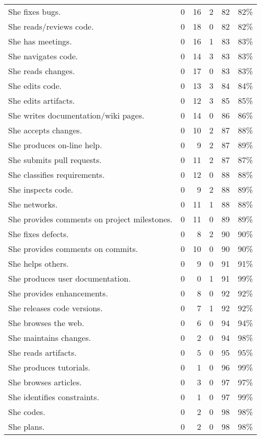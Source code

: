 \documentclass[10pt,conference]{IEEEtran}
\begin{document}
\begin{sloppy}
\begin{table*}
\begin{tabular}{l|rrrr|r}
She fixes bugs. & 0 & 16 & 2 & 82 & 82\% \\
She reads/reviews code. & 0 & 18 & 0 & 82 & 82\% \\
She has meetings. & 0 & 16 & 1 & 83 & 83\% \\
She navigates code. & 0 & 14 & 3 & 83 & 83\% \\
She reads changes. & 0 & 17 & 0 & 83 & 83\% \\
She edits code. & 0 & 13 & 3 & 84 & 84\% \\
She edits artifacts. & 0 & 12 & 3 & 85 & 85\% \\
She writes documentation/wiki pages. & 0 & 14 & 0 & 86 & 86\% \\
She accepts changes. & 0 & 10 & 2 & 87 & 88\% \\
She produces on-line help. & 0 & 9 & 2 & 87 & 89\% \\
She submits pull requests. & 0 & 11 & 2 & 87 & 87\% \\
She classifies requirements. & 0 & 12 & 0 & 88 & 88\% \\
She inspects code. & 0 & 9 & 2 & 88 & 89\% \\
She networks. & 0 & 11 & 1 & 88 & 88\% \\
She provides comments on project milestones. & 0 & 11 & 0 & 89 & 89\% \\
She fixes defects. & 0 & 8 & 2 & 90 & 90\% \\
She provides comments on commits. & 0 & 10 & 0 & 90 & 90\% \\
She helps others. & 0 & 9 & 0 & 91 & 91\% \\
She produces user documentation. & 0 & 0 & 1 & 91 & 99\% \\
She provides enhancements. & 0 & 8 & 0 & 92 & 92\% \\
She releases code versions. & 0 & 7 & 1 & 92 & 92\% \\
She browses the web. & 0 & 6 & 0 & 94 & 94\% \\
She maintains changes. & 0 & 2 & 0 & 94 & 98\% \\
She reads artifacts. & 0 & 5 & 0 & 95 & 95\% \\
She produces tutorials. & 0 & 1 & 0 & 96 & 99\% \\
She browses articles. & 0 & 3 & 0 & 97 & 97\% \\
She identifies constraints. & 0 & 1 & 0 & 97 & 99\% \\
She codes. & 0 & 2 & 0 & 98 & 98\% \\
She plans. & 0 & 2 & 0 & 98 & 98\% \\

\end{tabular}
\end{table*}
\end{sloppy}
\end{document}
